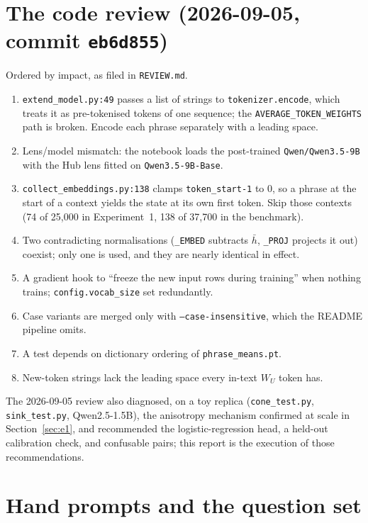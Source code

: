 \documentclass[11pt]{article}
\newcommand{\WU}{W_U}
\renewcommand{\hbar}{\bar{h}}
\begin{document}
\section{The code review (2026-09-05, commit \texttt{eb6d855})}
\label{app:review}
Ordered by impact, as filed in \texttt{REVIEW.md}.
\begin{enumerate}[leftmargin=1.6em,itemsep=2pt]
\item \texttt{extend\_model.py:49} passes a list of strings to \texttt{tokenizer.encode}, which treats it as pre-tokenised tokens of one sequence; the \texttt{AVERAGE\_TOKEN\_WEIGHTS} path is broken. Encode each phrase separately with a leading space.
\item Lens/model mismatch: the notebook loads the post-trained \texttt{Qwen/Qwen3.5-9B} with the Hub lens fitted on \texttt{Qwen3.5-9B-Base}.
\item \texttt{collect\_embeddings.py:138} clamps \texttt{token\_start-1} to 0, so a phrase at the start of a context yields the state at its own first token. Skip those contexts (74 of 25{,}000 in Experiment~1, 138 of 37{,}700 in the benchmark).
\item Two contradicting normalisations (\texttt{\_EMBED} subtracts $\hbar$, \texttt{\_PROJ} projects it out) coexist; only one is used, and they are nearly identical in effect.
\item A gradient hook to ``freeze the new input rows during training'' when nothing trains; \texttt{config.vocab\_size} set redundantly.
\item Case variants are merged only with \texttt{--case-insensitive}, which the README pipeline omits.
\item A test depends on dictionary ordering of \texttt{phrase\_means.pt}.
\item New-token strings lack the leading space every in-text $\WU$ token has.
\end{enumerate}
The 2026-09-05 review also diagnosed, on a toy replica (\texttt{cone\_test.py}, \texttt{sink\_test.py}, Qwen2.5-1.5B), the anisotropy mechanism confirmed at scale in Section~\ref{sec:e1}, and recommended the logistic-regression head, a held-out calibration check, and confusable pairs; this report is the execution of those recommendations.

\section{Hand prompts and the question set}


\end{document}
